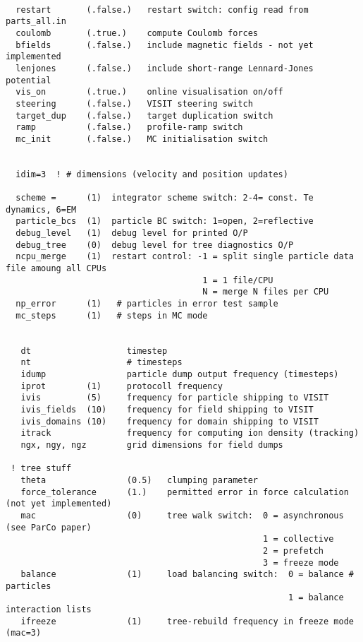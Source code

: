 \documentclass[12pt,psfig]{article}
\begin{document}
\begin{verbatim}

  restart       (.false.)   restart switch: config read from parts_all.in
  coulomb       (.true.)    compute Coulomb forces
  bfields       (.false.)   include magnetic fields - not yet implemented
  lenjones      (.false.)   include short-range Lennard-Jones potential
  vis_on        (.true.)    online visualisation on/off
  steering      (.false.)   VISIT steering switch
  target_dup    (.false.)   target duplication switch
  ramp          (.false.)   profile-ramp switch
  mc_init       (.false.)   MC initialisation switch


  idim=3  ! # dimensions (velocity and position updates)

  scheme =      (1)  integrator scheme switch: 2-4= const. Te dynamics, 6=EM
  particle_bcs  (1)  particle BC switch: 1=open, 2=reflective
  debug_level   (1)  debug level for printed O/P
  debug_tree    (0)  debug level for tree diagnostics O/P
  ncpu_merge    (1)  restart control: -1 = split single particle data file amoung all CPUs
                                       1 = 1 file/CPU
                                       N = merge N files per CPU
  np_error      (1)   # particles in error test sample
  mc_steps      (1)   # steps in MC mode


   dt                   timestep
   nt                   # timesteps 
   idump                particle dump output frequency (timesteps)
   iprot        (1)     protocoll frequency
   ivis         (5)     frequency for particle shipping to VISIT
   ivis_fields  (10)    frequency for field shipping to VISIT
   ivis_domains (10)    frequency for domain shipping to VISIT
   itrack               frequency for computing ion density (tracking)
   ngx, ngy, ngz        grid dimensions for field dumps

 ! tree stuff
   theta                (0.5)   clumping parameter
   force_tolerance      (1.)    permitted error in force calculation (not yet implemented)
   mac                  (0)     tree walk switch:  0 = asynchronous  (see ParCo paper)
                                                   1 = collective
                                                   2 = prefetch
                                                   3 = freeze mode
   balance              (1)     load balancing switch:  0 = balance # particles
                                                        1 = balance interaction lists
   ifreeze              (1)     tree-rebuild frequency in freeze mode (mac=3)


\end{verbatim}
\end{document}

